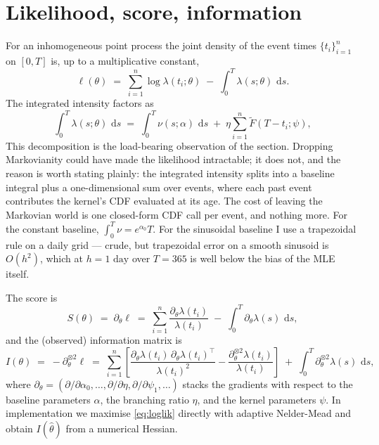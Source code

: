 \documentclass[article,shortnames,nojss]{jss}
\newcommand{\rmd}{\,\mathrm{d}}
\newcommand{\1}{\mathbbm{1}}
\theoremstyle{plain}
\theoremstyle{definition}
\begin{document}
\section{Likelihood, score, information}\label{sec:likelihood}

For an inhomogeneous point process the joint density of the event
times $\{t_i\}_{i=1}^n$ on $[0,T]$ is, up to a multiplicative
constant,
\begin{equation}\label{eq:loglik}
  \ell(\theta) \;=\; \sum_{i=1}^{n}\log \lambda(t_i;\theta)
  \;-\; \int_0^T \lambda(s;\theta)\,\rmd s.
\end{equation}
The integrated intensity factors as
\begin{equation}\label{eq:integral-decomp}
  \int_0^T \lambda(s;\theta)\,\rmd s
  \;=\; \int_0^T \nu(s;\alpha)\,\rmd s
  \;+\; \eta \sum_{i=1}^{n} \tilde F(T - t_i;\psi),
\end{equation}
This decomposition is the load-bearing observation of the
section. Dropping Markovianity could have made the likelihood
intractable; it does not, and the reason is worth stating
plainly: the integrated intensity splits into a baseline
integral plus a one-dimensional sum over events, where each
past event contributes the kernel's CDF evaluated at its age.
The cost of leaving the Markovian world is one closed-form CDF
call per event, and nothing more. For the constant baseline,
$\int_0^T \nu = e^{\alpha_0}T$. For the sinusoidal baseline I
use a trapezoidal rule on a daily grid --- crude, but
trapezoidal error on a smooth sinusoid is $O(h^2)$, which at
$h=1\text{ day}$ over $T=365$ is well below the bias of the
MLE itself.

The score is
\begin{equation}\label{eq:score}
  S(\theta) \;=\; \partial_\theta \ell
  \;=\; \sum_{i=1}^{n}\frac{\partial_\theta \lambda(t_i)}{\lambda(t_i)}
  \;-\; \int_0^T \partial_\theta \lambda(s)\,\rmd s,
\end{equation}
and the (observed) information matrix is
\begin{equation}\label{eq:info}
  I(\theta) \;=\; -\partial_\theta^{\otimes 2}\ell
  \;=\; \sum_{i=1}^{n}\!\left[
      \frac{\partial_\theta\lambda(t_i)\,\partial_\theta\lambda(t_i)^{\!\top}}{\lambda(t_i)^2}
      - \frac{\partial_\theta^{\otimes 2}\lambda(t_i)}{\lambda(t_i)}
    \right]
    \;+\; \int_0^T\! \partial_\theta^{\otimes 2}\lambda(s)\,\rmd s,
\end{equation}
where $\partial_\theta = (\partial/\partial\alpha_0,\dots,
\partial/\partial\eta,\partial/\partial\psi_1,\dots)$ stacks the
gradients with respect to the baseline parameters $\alpha$, the
branching ratio $\eta$, and the kernel parameters $\psi$.  In
implementation we maximise \eqref{eq:loglik} directly with
adaptive Nelder-Mead and obtain $I(\hat\theta)$ from a numerical
Hessian.
\end{document}
